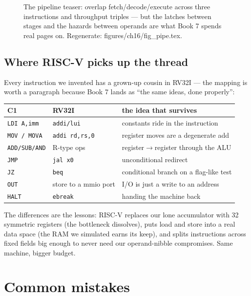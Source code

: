 \begin{figure}[htbp]
\centering

\caption{The pipeline teaser: overlap fetch/decode/execute across
three instructions and throughput triples --- but the latches between
stages and the hazards between operands are what Book 7 spends real
pages on. Regenerate: \ttfamily figures/ch16/fig\_pipe.tex.}
\label{fig:pipe16}
\end{figure}

\subsection{Where RISC-V picks up the thread}\label{sec:riscv16}

Every instruction we invented has a grown-up cousin in RV32I --- the
mapping is worth a paragraph because Book 7 lands as ``the same
ideas, done properly'':

\begin{center}
\begin{tabular}{lll}
\toprule
C1 & RV32I & the idea that survives\\
\midrule
\texttt{LDI A,imm} & \texttt{addi/lui} & constants ride in the instruction\\
\texttt{MOV / MOVA} & \texttt{addi rd,rs,0} & register moves are a degenerate add\\
\texttt{ADD/SUB/AND} & R-type ops & register$\to$register through the ALU\\
\texttt{JMP} & \texttt{jal x0} & unconditional redirect\\
\texttt{JZ} & \texttt{beq} & conditional branch on a flag-like test\\
\texttt{OUT} & store to a mmio port & I/O is just a write to an address\\
\texttt{HALT} & \texttt{ebreak} & handing the machine back\\
\bottomrule
\end{tabular}
\end{center}

The differences are the lessons: RISC-V replaces our lone accumulator
with 32 symmetric registers (the bottleneck dissolves), puts load and
store into a real data space (the RAM we simulated earns its keep),
and splits instructions across fixed fields big enough to never need
our operand-nibble compromises. Same machine, bigger budget.

\section{Common mistakes}\label{sec:cm16}

